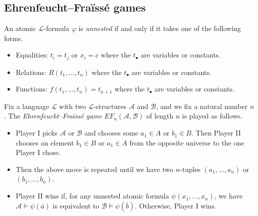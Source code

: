 \documentclass{article}
\begin{document}
\subsection{Ehrenfeucht--Fra\"iss\'e games}
\begin{definition}[unnested]
	An atomic $\mathcal L$-formula $\varphi$ is \textit{unnested} if and only if it takes one of the following forms.
	\begin{itemize}
		\item Equalities: $t_i=t_j$ or $x_i=c$ where the $t_\bullet$ are variables or constants.
		\item Relations: $R(t_1,\ldots,t_n)$ where the $t_\bullet$ are variables or constants.
		\item Functions: $f(t_1,\ldots,t_n)=t_{n+1}$ where the $t_\bullet$ are variables or constants.
	\end{itemize}
\end{definition}
\begin{definition}
	Fix a language $\mathcal L$ with two $\mathcal L$-structures $\mathcal A$ and $\mathcal B$, and we fix a natural number $n$. The \textit{Ehrenfeucht--Fra\"iss\'e game} $EF_n(\mathcal A,\mathcal B)$ of length $n$ is played as follows.
	\begin{itemize}
		\item Player I picks $\mathcal A$ or $\mathcal B$ and chooses some $a_1\in A$ or $b_1\in B$. Then Player II chooses an element $b_1\in B$ or $a_1\in A$ from the opposite universe to the one Player I chose.
		\item Then the above move is repeated until we have two $n$-tuples $(a_1,\ldots,a_n)$ or $(b_1,\ldots,b_n)$.
		\item Player II wins if, for any unnested atomic formula $\psi(x_1,\ldots,x_n)$, we have $\mathcal A\models\psi(\overline a)$ is equivalent to $\mathcal B\models\psi(\overline b)$. Otherwise, Player I wins.
	\end{itemize}
\end{definition}
\end{document}
